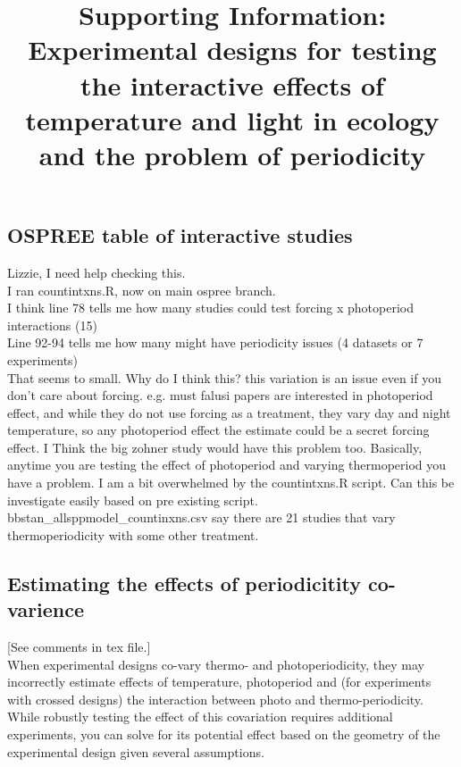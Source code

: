 \documentclass[11pt]{article}
\title{Supporting Information: Experimental designs for testing the interactive effects of temperature and light in ecology and the problem of periodicity }
\begin{document}
\maketitle
\subsection{OSPREE table of interactive studies}
Lizzie, I need help checking this.\\
I ran countintxns.R, now on main ospree branch.\\
I think line 78 tells me how many studies could test forcing x photoperiod interactions (15)\\
Line 92-94 tells me how many might have periodicity issues (4 datasets or 7 experiments)\\

That seems to small. Why do I think this? this variation is an issue even if you don't care about forcing. e.g. must falusi papers are interested in photoperiod effect, and while they do not use forcing as a treatment, they vary day and night temperature, so any photoperiod effect the estimate could be a secret forcing effect. I Think the big zohner study would have this problem too. Basically, anytime you are testing the effect of photoperiod and varying thermoperiod you have a problem. I am a bit overwhelmed by the countintxns.R script. Can this be investigate easily based on pre existing script. bbstan_allsppmodel_countinxns.csv say there are 21 studies that vary thermoperiodicity with some other treatment. 

\subsection{Estimating the effects of periodicitity co-varience}
[See comments in tex file.] \\
When experimental designs co-vary thermo- and photoperiodicity, they may incorrectly estimate effects of temperature, photoperiod and (for experiments with crossed designs) the interaction between photo and thermo-periodicity. While robustly testing the effect of this covariation requires additional experiments, you can solve for its potential effect based on the geometry of the experimental design given several assumptions.\\
\end{document}
